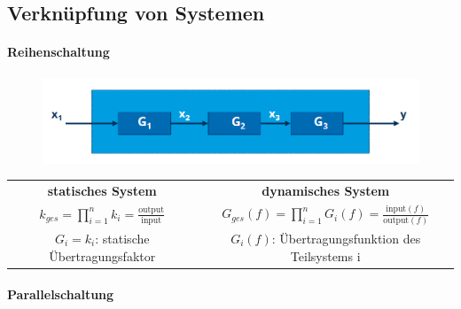 \documentclass[12pt,a4paper]{article}
\begin{document}
\subsection{Verknüpfung von Systemen}

\paragraph{Reihenschaltung}
\hspace{1pt}
\begin{figure}[H]
\includegraphics[scale=0.5]{./resources/reihenschaltung.png}
\end{figure}
\begin{tabular}{|c|c|}
\hline
\textbf{statisches System} & \textbf{dynamisches System} \\
$\displaystyle k_{ges} = \prod_{i=1}^n k_i = \frac{\text{output}}{\text{input}}$ & $\displaystyle G_{ges}(f) = \prod_{i=1}^n G_i(f) = \frac{\text{input}(f)}{\text{output}(f)}$ \\
\hline
$G_i = k_i$: statische Übertragungsfaktor & $G_i(f)$: Übertragungsfunktion des Teilsystems i \\
\hline
\end{tabular}

\paragraph{Parallelschaltung}
\hspace{1pt}\\
\end{document}
